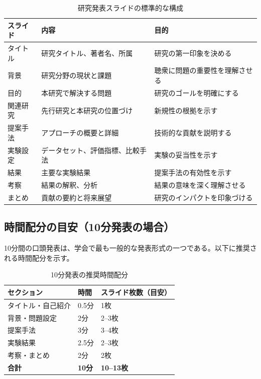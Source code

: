 \begin{table}[htbp]
\centering
\caption{研究発表スライドの標準的な構成}
\label{tab:slide-structure}
\footnotesize
\begin{tabular}{lll}
\toprule
スライド & 内容 & 目的 \\
\midrule
タイトル & 研究タイトル、著者名、所属 & 研究の第一印象を決める \\
背景 & 研究分野の現状と課題 & 聴衆に問題の重要性を理解させる \\
目的 & 本研究で解決する問題 & 研究のゴールを明確にする \\
関連研究 & 先行研究と本研究の位置づけ & 新規性の根拠を示す \\
提案手法 & アプローチの概要と詳細 & 技術的な貢献を説明する \\
実験設定 & データセット、評価指標、比較手法 & 実験の妥当性を示す \\
結果 & 主要な実験結果 & 提案手法の有効性を示す \\
考察 & 結果の解釈、分析 & 結果の意味を深く理解させる \\
まとめ & 貢献の要約と将来展望 & 研究のインパクトを印象づける \\
\bottomrule
\end{tabular}
\end{table}

\subsection{時間配分の目安（10分発表の場合）}

10分間の口頭発表は、学会で最も一般的な発表形式の一つである。以下に推奨される時間配分を示す。

\begin{table}[htbp]
\centering
\caption{10分発表の推奨時間配分}
\label{tab:time-allocation}
\begin{tabular}{lll}
\toprule
セクション & 時間 & スライド枚数（目安） \\
\midrule
タイトル・自己紹介 & 0.5分 & 1枚 \\
背景・問題設定 & 2分 & 2--3枚 \\
提案手法 & 3分 & 3--4枚 \\
実験結果 & 2.5分 & 2--3枚 \\
考察・まとめ & 2分 & 2枚 \\
\midrule
\textbf{合計} & \textbf{10分} & \textbf{10--13枚} \\
\bottomrule
\end{tabular}
\end{table}

